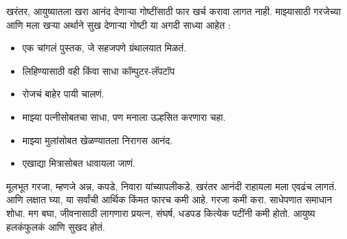 खरंतर, आयुष्यातला खरा आनंद देणाऱ्या गोष्टींसाठी फार खर्च करावा लागत नाही. माझ्यासाठी गरजेच्या आणि मला खऱ्या अर्थाने सुख देणाऱ्या गोष्टी या अगदी साध्या आहेत :
\begin{itemize}
 \item एक चांगलं पुस्तक, जे सहजपणे ग्रंथालयात मिळतं.
 \item लिहिण्यासाठी वही किंवा साधा कॉम्पुटर-लॅपटॉप
 \item रोजचं बाहेर पायी चालणं.
 \item माझ्या पत्नीसोबतचा साधा, पण मनाला उल्हसित करणारा चहा.
 \item माझ्या मुलांसोबत खेळण्यातला निरागस आनंद.
 \item एखाद्या मित्रासोबत धावायला जाणं.
 \end{itemize}
मूलभूत गरजा, म्हणजे अन्न, कपडे, निवारा यांच्यापलीकडे, खरंतर आनंदी राहायला मला एवढंच लागतं. आणि लक्षात घ्या, या सर्वांची आर्थिक किंमत फारच कमी आहे.
गरजा कमी करा. साधेपणात समाधान शोधा. मग बघा, जीवनासाठी लागणारा प्रयत्न, संघर्ष, धडपड कित्येक पटींनी कमी होतो. आयुष्य हलकंफुलकं आणि सुखद होतं.

